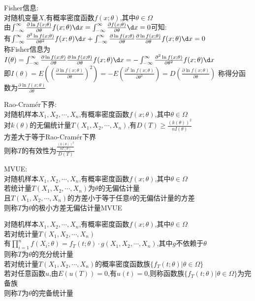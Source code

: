 \begin{dingyi}
Fisher信息:\\
对随机变量$X$,有概率密度函数$f(x;\theta)$,其中$\theta\in\Omega$\\
由$\int_{-\infty}^{\infty}\frac{\partial \ln f(x;\theta)}{\partial\theta}f(x;\theta)\d x=\int_{-\infty}^{\infty}\frac{\partial f(x;\theta)}{\partial\theta}\d x=0$可知:\\
有$\int_{-\infty}^{\infty}\frac{\partial^2 \ln f(x;\theta)}{\partial\theta^2}f(x;\theta)\d x+\int_{-\infty}^{\infty}\frac{\partial \ln f(x;\theta)}{\partial\theta}\frac{\partial \ln f(x;\theta)}{\partial\theta}f(x;\theta)\d x=0$\\
称Fisher信息为$I(\theta)=\int_{-\infty}^{\infty}\frac{\partial \ln f(x;\theta)}{\partial\theta}\frac{\partial \ln f(x;\theta)}{\partial\theta}f(x;\theta)\d x=-\int_{-\infty}^{\infty}\frac{\partial^2 \ln f(x;\theta)}{\partial\theta^2}f(x;\theta)\d x$\\
即$I(\theta)=E((\frac{\partial \ln f(x;\theta)}{\partial\theta})^2)=-E(\frac{\partial^2 \ln f(x;\theta)}{\partial\theta^2})=D(\frac{\partial \ln f(x;\theta)}{\partial\theta})$
称得分函数为$\frac{\partial \ln f(x;\theta)}{\partial\theta}$
\end{dingyi}

\begin{dingyi}
Rao-Cramér下界:\\
对随机样本$X_1,X_2,\cdots,X_n$,有概率密度函数$f(x;\theta)$,其中$\theta\in\Omega$\\
对$k(\theta)$的无偏统计量$T(X_1,X_2,\cdots,X_n)$,有$D(T)\geq \frac{(k(\theta))^2}{nI(\theta)}$\\
方差大于等于Rao-Cramér下界\\
则称$T$的有效性为$\frac{\frac{(k(\theta))^2}{nI(\theta)}}{D(T)}$
\end{dingyi}

\begin{dingyi}
MVUE:\\
对随机样本$X_1,X_2,\cdots,X_n$,有概率密度函数$f(x;\theta)$,其中$\theta\in\Omega$\\
若统计量$T(X_1,X_2,\cdots,X_n)$为$\theta$的无偏估计量\\
且$T(X_1,X_2,\cdots,X_n)$的方差小于等于任意$\theta$的无偏估计量的方差\\
则称$T$为$\theta$的极小方差无偏估计量MVUE
\end{dingyi}

\begin{dingyi}
对随机样本$X_1,X_2,\cdots,X_n$,有概率密度函数$f(x;\theta)$,其中$\theta\in\Omega$\\
若对统计量$T(X_1,X_2,\cdots,X_n)$\\
有$\prod\limits_{i=1}^{n}f(X_i;\theta)=f_{T}(t;\theta)\cdot g(X_1,X_2,\cdots,X_n)$,其中$g$不依赖于$\theta$\\
则称$T$为$\theta$的充分统计量\\
若对统计量$T(X_1,X_2,\cdots,X_n)$的概率密度函数族$\{f_T(t;\theta)|\theta\in\Omega\}$\\
若对任意函数$u$,由$E(u(T))=0$,有$u(t)=0$,则称函数族$\{f_T(t;\theta)|\theta\in\Omega\}$为完备族\\
则称$T$为$\theta$的完备统计量
\end{dingyi}

